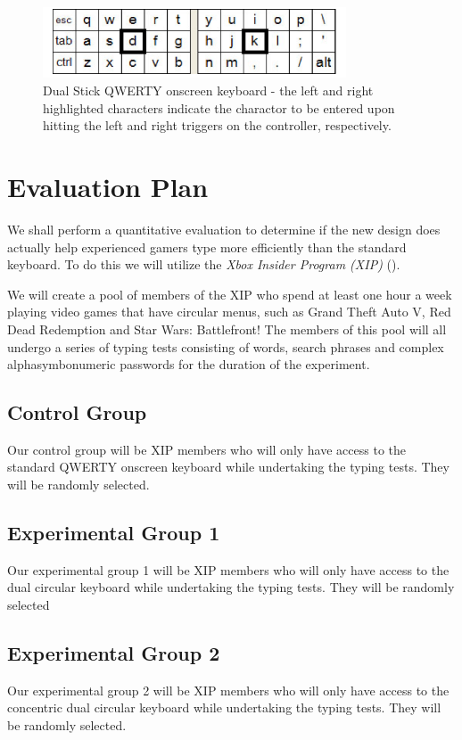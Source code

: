 \documentclass[
	letterpaper, %
]{jdf}
\begin{document}
\begin{figure}[h]
	\centering
	\includegraphics[width=9cm]{jdf-master/Figures/dual-stick-keyboard.png}
	\caption{Dual Stick QWERTY onscreen keyboard - the left and right highlighted characters indicate the charactor to be entered upon hitting the left and right triggers on the controller, respectively.}
	\label{fig:dual-stick-qwerty}
\end{figure}



\section{Evaluation Plan}
We shall perform a quantitative evaluation to determine if the new design does actually help experienced gamers type more efficiently than the standard keyboard. To do this we will utilize the \textit{Xbox Insider Program (XIP)} (\cite{dean_2019}).

We will create a pool of members of the XIP who spend at least one hour a week playing video games that have circular menus, such as Grand Theft Auto V, Red Dead Redemption and Star Wars: Battlefront! The members of this pool will all  undergo a series of typing tests consisting of words, search phrases and complex alphasymbonumeric passwords for the duration of the experiment.

\subsection{Control Group}
Our control group will be XIP members who will only have access to the standard QWERTY onscreen keyboard while undertaking the typing tests. They will be randomly selected.
\subsection{Experimental Group 1}
Our experimental group 1 will be XIP members who will only have access to the dual circular keyboard while undertaking the typing tests. They will be randomly selected 
\subsection{Experimental Group 2}
Our experimental group 2 will be XIP members who will only have access to the concentric dual circular keyboard while undertaking the typing tests. They will be randomly selected.
\end{document}
